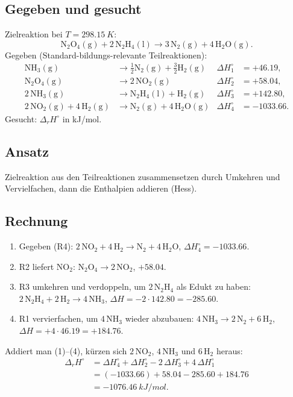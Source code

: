 
\subsection*{Gegeben und gesucht}
Zielreaktion bei $T = \qty{298.15}{K}$:
\begin{equation*}
  \mathrm{N_2O_4(g)} + 2\,\mathrm{N_2H_4(l)} \rightarrow
  3\,\mathrm{N_2(g)} + 4\,\mathrm{H_2O(g)}.
\end{equation*}
Gegeben (Standard-bildungs-relevante Teilreaktionen):
\begin{align*}
  \mathrm{NH_3(g)} &\rightarrow \tfrac12\mathrm{N_2(g)} + \tfrac32\mathrm{H_2(g)}
    &\Delta H_1^\circ &= +46.19,\\
  \mathrm{N_2O_4(g)} &\rightarrow 2\,\mathrm{NO_2(g)}
    &\Delta H_2^\circ &= +58.04,\\
  2\,\mathrm{NH_3(g)} &\rightarrow \mathrm{N_2H_4(l)} + \mathrm{H_2(g)}
    &\Delta H_3^\circ &= +142.80,\\
  2\,\mathrm{NO_2(g)} + 4\,\mathrm{H_2(g)} &\rightarrow \mathrm{N_2(g)} + 4\,\mathrm{H_2O(g)}
    &\Delta H_4^\circ &= -1033.66.
\end{align*}
Gesucht: $\Delta_rH^\circ$ in kJ/mol.

\subsection*{Ansatz}
Zielreaktion aus den Teilreaktionen zusammensetzen durch Umkehren und
Vervielfachen, dann die Enthalpien addieren (Hess).

\subsection*{Rechnung}
\begin{enumerate}
  \item Gegeben (R4): $2\,\mathrm{NO_2} + 4\,\mathrm{H_2} \rightarrow
        \mathrm{N_2} + 4\,\mathrm{H_2O}$,
        $\Delta H_4^\circ = -1033.66$.
  \item R2 liefert $\mathrm{NO_2}$: $\mathrm{N_2O_4} \rightarrow
        2\,\mathrm{NO_2}$, $+58.04$.
  \item R3 umkehren und verdoppeln, um $2\,\mathrm{N_2H_4}$ als Edukt zu haben:
        $2\,\mathrm{N_2H_4} + 2\,\mathrm{H_2} \rightarrow
        4\,\mathrm{NH_3}$, $\Delta H = -2\cdot 142.80 = -285.60$.
  \item R1 vervierfachen, um $4\,\mathrm{NH_3}$ wieder abzubauen:
        $4\,\mathrm{NH_3} \rightarrow 2\,\mathrm{N_2} + 6\,\mathrm{H_2}$,
        $\Delta H = +4\cdot 46.19 = +184.76$.
\end{enumerate}
Addiert man (1)--(4), kürzen sich $2\,\mathrm{NO_2}$, $4\,\mathrm{NH_3}$ und
$6\,\mathrm{H_2}$ heraus:
\begin{align*}
  \Delta_rH^\circ &=
  \Delta H_4^\circ + \Delta H_2^\circ -2\,\Delta H_3^\circ +4\,\Delta H_1^\circ \\[2pt]
  &= (-1033.66) + 58.04 - 285.60 + 184.76 \\
  &= \qty{-1076.46}{kJ/mol}.
\end{align*}

